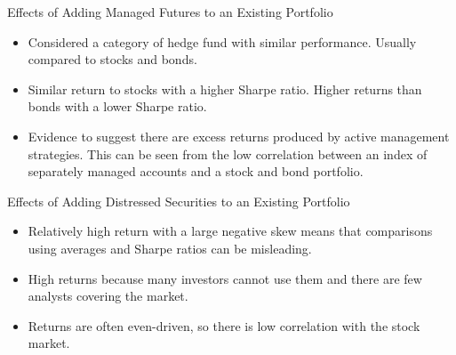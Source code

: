 \documentclass[../custom,grid]{flashcards}
\begin{document}
\begin{flashcard}{Effects of Adding Managed Futures to an Existing Portfolio}
    \begin{itemize}
        \item Considered a category of hedge fund with similar performance. Usually compared to stocks and bonds.
        \item Similar return to stocks with a higher Sharpe ratio. Higher returns than bonds with a lower Sharpe ratio.
        \item Evidence to suggest there are excess returns produced by active management strategies. This can be seen from the low correlation between an index of separately managed accounts and a stock and bond portfolio.
    \end{itemize}
\end{flashcard}

\begin{flashcard}{Effects of Adding Distressed Securities to an Existing Portfolio}
    \begin{itemize}
        \item Relatively high return with a large negative skew means that comparisons using averages and Sharpe ratios can be misleading.
        \item High returns because many investors cannot use them and there are few analysts covering the market.
        \item Returns are often even-driven, so there is low correlation with the stock market.
    \end{itemize}
\end{flashcard}
\end{document}

